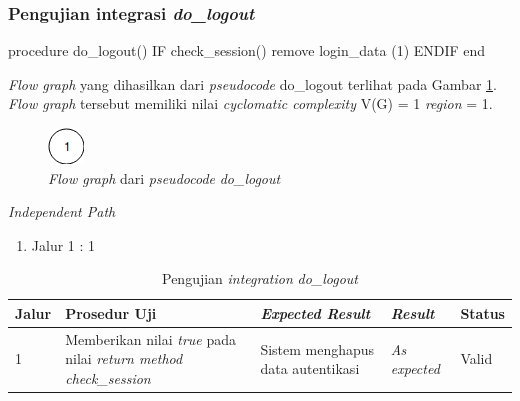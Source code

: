\subsubsection{Pengujian integrasi \emph{do\_logout}}

\begin{code}
\begin{ignasicblock}[title=do\_logout,minted language=text]
procedure do_logout()
    IF check_session()
        remove login_data     (1)
    ENDIF
end
\end{ignasicblock}
\label{pc:do_logout}
\end{code}

\par\null\par
\noindent
\emph{Flow graph} yang dihasilkan dari \emph{pseudocode}
do\_logout terlihat pada Gambar \ref{cfg:do_logout}. \emph{Flow graph} tersebut memiliki
nilai \emph{cyclomatic complexity} V(G) = 1 \emph{region} = 1.

\begin{figure}[H]
  \centering
  \includegraphics[width=.06\linewidth]{img/test-case/1node}
  \caption{\emph{Flow graph} dari \emph{pseudocode} \emph{do\_logout}}
  \label{cfg:do_logout}
\end{figure}

\newpage

\noindent
\emph{Independent Path}

\begin{enumerate}
\item Jalur 1 : 1
\end{enumerate}

\begin{longtable}{|P{.06\textwidth}|P{.30\textwidth}|P{.30\textwidth}|P{.10\textwidth}|P{.08\textwidth}|}
  \caption{Pengujian \emph{integration} \emph{do\_logout}} \label{jalur:do_logout}\\
  \hline
  \textbf{Jalur} & \textbf{Prosedur Uji} & \textbf{\emph{Expected Result}}
  & \textbf{\emph{Result}} & \textbf{Status} \\\hline
  1 & Memberikan nilai \emph{true} pada nilai \emph{return method check\_session}
                                             & Sistem menghapus
                                               data autentikasi & \emph{As expected} & Valid \\\hline
\end{longtable}

